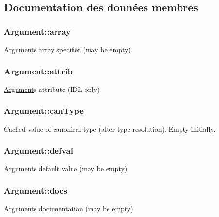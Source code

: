 \subsection{Documentation des données membres}
\hypertarget{struct_argument_a9e33101befb3a977ac863d8a595ed210}{}
\subsubsection[{array}]{ Argument\+::array}\label{struct_argument_a9e33101befb3a977ac863d8a595ed210}
\hyperlink{struct_argument}{Argument}\textquotesingle{}s array specifier (may be empty) \hypertarget{struct_argument_aff930f2a4cb85b5616be79b81db2341f}{}
\subsubsection[{attrib}]{ Argument\+::attrib}\label{struct_argument_aff930f2a4cb85b5616be79b81db2341f}
\hyperlink{struct_argument}{Argument}\textquotesingle{}s attribute (I\+D\+L only) \hypertarget{struct_argument_ac20b3c80630f773cf72f13c6e44b235a}{}
\subsubsection[{can\+Type}]{ Argument\+::can\+Type}\label{struct_argument_ac20b3c80630f773cf72f13c6e44b235a}
Cached value of canonical type (after type resolution). Empty initially. \hypertarget{struct_argument_a4fe1d9319dede52f7551f59297772efa}{}
\subsubsection[{defval}]{ Argument\+::defval}\label{struct_argument_a4fe1d9319dede52f7551f59297772efa}
\hyperlink{struct_argument}{Argument}\textquotesingle{}s default value (may be empty) \hypertarget{struct_argument_a5d6cd35aa392b1703acf14104b19c589}{}
\subsubsection[{docs}]{ Argument\+::docs}\label{struct_argument_a5d6cd35aa392b1703acf14104b19c589}
\hyperlink{struct_argument}{Argument}\textquotesingle{}s documentation (may be empty) \hypertarget{struct_argument_a334668ce5d1f650c804e69f1bc941a3b}{}

